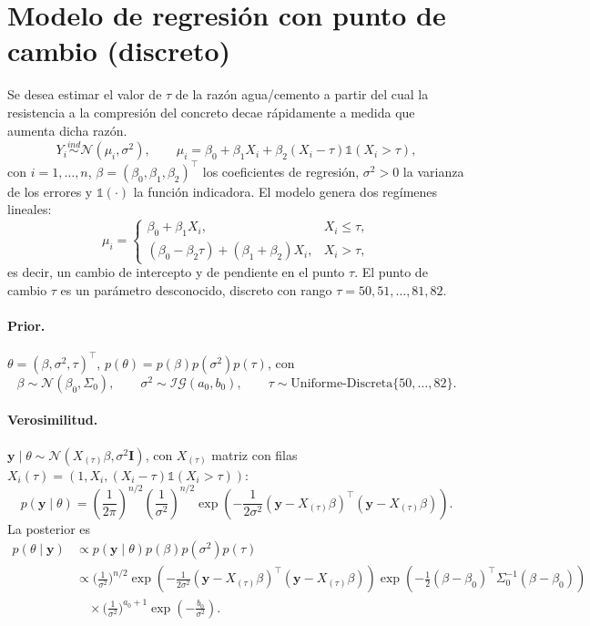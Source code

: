 \documentclass[11pt]{article}
\newcommand{\N}{\mathcal{N}}
\newcommand{\IG}{\mathcal{IG}}
\newcommand{\ind}{\mathbb{1}}
\newcommand{\by}{\mathbf{y}}
\newcommand{\bI}{\mathbf{I}}
\theoremstyle{definition}
\begin{document}
\section{Modelo de regresión con punto de cambio (discreto)}
Se desea estimar el valor de $\tau$ de la razón agua/cemento a partir del cual la resistencia a la compresión del concreto decae rápidamente a medida que aumenta dicha razón.
\[
Y_i\overset{ind}{\sim}\N(\mu_i,\sigma^2),\qquad \mu_i=\beta_0+\beta_1 X_i+\beta_2(X_i-\tau)\ind(X_i>\tau),
\]
con $i=1,\dots,n$, $\beta=(\beta_0,\beta_1,\beta_2)^{\top}$ los coeficientes de regresión, $\sigma^2>0$ la varianza de los errores y $\ind(\cdot)$ la función indicadora. El modelo genera dos regímenes lineales:
\[
\mu_i=\begin{cases}
\beta_0+\beta_1 X_i, & X_i\le\tau,\\[2pt]
(\beta_0-\beta_2\tau)+(\beta_1+\beta_2)X_i, & X_i>\tau,
\end{cases}
\]
es decir, un cambio de intercepto y de pendiente en el punto $\tau$. El punto de cambio $\tau$ es un parámetro desconocido, discreto con rango $\tau=50,51,\dots,81,82$.

\paragraph{Prior.} $\theta=(\beta,\sigma^2,\tau)^{\top}$, $p(\theta)=p(\beta)p(\sigma^2)p(\tau)$, con
\[
\beta\sim\N(\beta_0,\Sigma_0),\qquad \sigma^2\sim\IG(a_0,b_0),\qquad \tau\sim\text{Uniforme-Discreta}\{50,\dots,82\}.
\]

\paragraph{Verosimilitud.} $\by\mid\theta\sim\N(X_{(\tau)}\beta,\sigma^2\bI)$, con $X_{(\tau)}$ matriz con filas $X_i(\tau)=(1,X_i,(X_i-\tau)\ind(X_i>\tau))$:
\[
p(\by\mid\theta)=\left(\frac{1}{2\pi}\right)^{n/2}\left(\frac{1}{\sigma^2}\right)^{n/2}\exp\!\left(-\frac{1}{2\sigma^2}(\by-X_{(\tau)}\beta)^{\top}(\by-X_{(\tau)}\beta)\right).
\]
La posterior es
\begin{align*}
p(\theta\mid\by)&\propto p(\by\mid\theta)p(\beta)p(\sigma^2)p(\tau)\\
&\propto\Big(\tfrac{1}{\sigma^2}\Big)^{n/2}\exp\!\left(-\tfrac{1}{2\sigma^2}(\by-X_{(\tau)}\beta)^{\top}(\by-X_{(\tau)}\beta)\right)\exp\!\left(-\tfrac12(\beta-\beta_0)^{\top}\Sigma_0^{-1}(\beta-\beta_0)\right)\\
&\quad\times\Big(\tfrac{1}{\sigma^2}\Big)^{a_0+1}\exp\!\left(-\tfrac{b_0}{\sigma^2}\right).
\end{align*}
\end{document}
